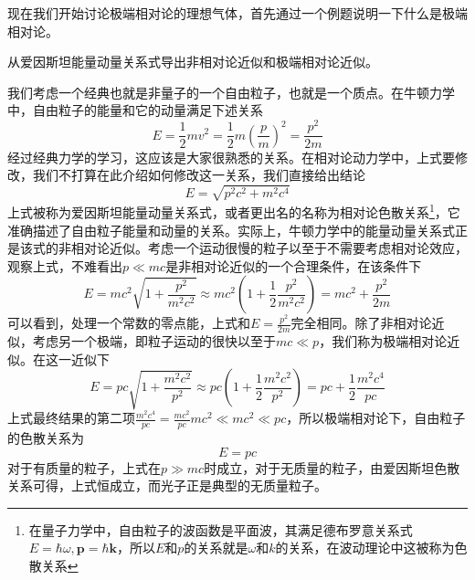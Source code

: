 \documentclass[../../main.tex]{subfiles}
\begin{document}
现在我们开始讨论极端相对论的理想气体，首先通过一个例题说明一下什么是极端相对论。
\begin{example}
    从爱因斯坦能量动量关系式导出非相对论近似和极端相对论近似。
    \begin{solution}
        我们考虑一个经典也就是非量子的一个自由粒子，也就是一个质点。在牛顿力学中，自由粒子的能量和它的动量满足下述关系
        \begin{equation}
            E=\frac{1}{2}mv^2=\frac{1}{2}m\left(\frac{p}{m}\right)^2=\frac{p^2}{2m}
        \end{equation}
        经过经典力学的学习，这应该是大家很熟悉的关系。在相对论动力学中，上式要修改，我们不打算在此介绍如何修改这一关系，我们直接给出结论
        \begin{equation}
            E=\sqrt{p^2c^2+m^2c^4}
        \end{equation}
        上式被称为爱因斯坦能量动量关系式，或者更出名的名称为相对论色散关系\footnote{在量子力学中，自由粒子的波函数是平面波，其满足德布罗意关系式\(E=\hbar\omega,\bm{p}=\hbar\bm{k}\)，所以\(E\)和\(p\)的关系就是\(\omega\)和\(k\)的关系，在波动理论中这被称为色散关系}，它准确描述了自由粒子能量和动量的关系。实际上，牛顿力学中的能量动量关系式正是该式的非相对论近似。考虑一个运动很慢的粒子以至于不需要考虑相对论效应，观察上式，不难看出\(p\ll mc\)是非相对论近似的一个合理条件，在该条件下
        \begin{equation}
            E=mc^2\sqrt{1+\frac{p^2}{m^2c^2}}\approx mc^2\left(1+\frac{1}{2}\frac{p^2}{m^2c^2}\right)=mc^2+\frac{p^2}{2m}
        \end{equation}
        可以看到，处理一个常数的零点能，上式和\(E=\frac{p^2}{2m}\)完全相同。除了非相对论近似，考虑另一个极端，即粒子运动的很快以至于\(mc\ll p\)，我们称为极端相对论近似。在这一近似下
        \begin{equation}
            E=pc\sqrt{1+\frac{m^2c^2}{p^2}}\approx pc\left(1+\frac{1}{2}\frac{m^2c^2}{p^2}\right)=pc+\frac{1}{2}\frac{m^2c^4}{pc}
        \end{equation}
        上式最终结果的第二项\(\frac{m^2c^4}{pc}=\frac{mc^2}{pc}mc^2\ll mc^2\ll pc\)，所以极端相对论下，自由粒子的色散关系为
        \begin{equation}
            E=pc
        \end{equation}
        对于有质量的粒子，上式在\(p\gg mc\)时成立，对于无质量的粒子，由爱因斯坦色散关系可得，上式恒成立，而光子正是典型的无质量粒子。
    \end{solution}
\end{example}
\end{document}
